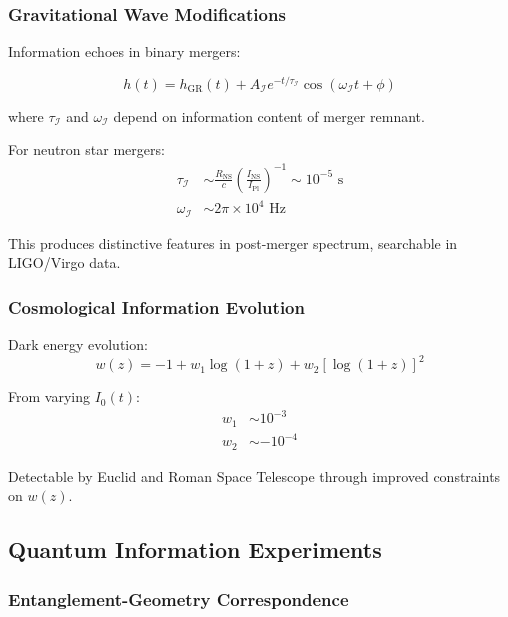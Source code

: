 \documentclass[12pt,a4paper]{article}
\theoremstyle{remark}
\begin{document}
\subsubsection{Gravitational Wave Modifications}

Information echoes in binary mergers:

\begin{equation}
h(t) = h_{\text{GR}}(t) + A_{\mathcal{I}}e^{-t/\tau_{\mathcal{I}}}\cos(\omega_{\mathcal{I}}t + \phi)
\end{equation}

where $\tau_{\mathcal{I}}$ and $\omega_{\mathcal{I}}$ depend on information content of merger remnant.

For neutron star mergers:
\begin{align}
\tau_{\mathcal{I}} &\sim \frac{R_{\text{NS}}}{c}\left(\frac{I_{\text{NS}}}{I_{\text{Pl}}}\right)^{-1} \sim 10^{-5} \text{ s} \\
\omega_{\mathcal{I}} &\sim 2\pi \times 10^4 \text{ Hz}
\end{align}

This produces distinctive features in post-merger spectrum, searchable in LIGO/Virgo data.

\subsubsection{Cosmological Information Evolution}

Dark energy evolution:
\begin{equation}
w(z) = -1 + w_1\log(1+z) + w_2[\log(1+z)]^2
\end{equation}

From varying $I_0(t)$:
\begin{align}
w_1 &\sim 10^{-3} \\
w_2 &\sim -10^{-4}
\end{align}

Detectable by Euclid and Roman Space Telescope through improved constraints on $w(z)$.

\subsection{Quantum Information Experiments}

\subsubsection{Entanglement-Geometry Correspondence}
\end{document}
